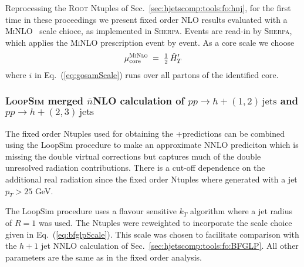 Reprocessing the \textsc{Root} Ntuples of Sec.\ 
\ref{sec:hjetscomp:tools:fo:hnj}, for the first time in these 
proceedings we present fixed order NLO results evaluated with a
\textsc{MiNLO}~\cite{Hamilton:2012np} scale chioce, as implemented in
\textsc{Sherpa}. Events are read-in by \textsc{Sherpa}, which applies
the \textsc{MiNLO} prescription event by event. As a \Minlo core scale
we choose
\begin{equation}
  \mu_\text{core}^\text{\protect\textsc{MiNlo}}\;=\;\tfrac{1}{2}\,\hat{H}^\prime_T
\end{equation}
where $i$ in Eq.~(\ref{eq:gosamScale}) runs over all partons of the
identified core.


\subsubsection{\textsc{LoopSim} merged $\bar{n}$NLO calculation of $pp\to h+(1,2)\,\text{jets}$ and $pp\to h+(2,3)\,\text{jets}$}
\label{sec:hjetscomp:tools:fo:hnjloopsim}

The fixed order Ntuples used for obtaining the \GoSam+\Sherpa predictions can be combined using
the LoopSim procedure to make an approximate NNLO prediciton which is missing the double virtual
corrections but captures much of the double unresolved radiation contributions. There is a cut-off
dependence on the additional real radiation since the fixed order Ntuples where generated with a
jet $p_T>25$ GeV.

The LoopSim procedure uses a flavour sensitive $k_T$ algorithm where a jet radius of $R=1$ was used.
The Ntuples were reweighted to incorporate the scale choice given in Eq.~(\ref{eq:bfglpScale}).
This scale was chosen to facilitate comparison with the $h+1$ jet NNLO
calculation of Sec.~\ref{sec:hjetscomp:tools:fo:BFGLP}.
All other parameters are the same as in the fixed order analysis.
